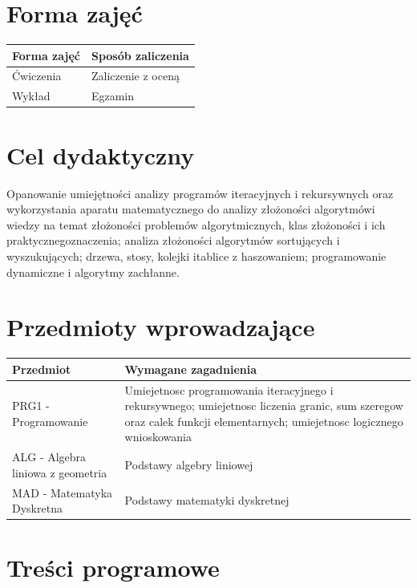 \documentclass[12pt, a4paper]{article}
\begin{document}
\section{Forma zajęć}

\begin{tabular}{ll}
  \hline
  \textbf{Forma zajęć} & \textbf{Sposób zaliczenia} \\
  \hline
  Ćwiczenia & Zaliczenie z oceną \\
  Wykład & Egzamin \\
  \hline
\end{tabular}

\section{Cel dydaktyczny}

Opanowanie umiejętności analizy programów iteracyjnych i rekursywnych oraz wykorzystania aparatu matematycznego do analizy złożoności algorytmówi wiedzy na temat złożoności problemów algorytmicznych, klas złożoności i ich praktycznegoznaczenia; analiza złożoności algorytmów sortujących i wyszukujących; drzewa, stosy, kolejki itablice z haszowaniem; programowanie dynamiczne i algorytmy zachłanne.

\section{Przedmioty wprowadzające}

\begin{tabularx}{\textwidth}{lX}
  \hline
  \textbf{Przedmiot} & \textbf{Wymagane zagadnienia} \\
  \hline
  PRG1 - Programowanie & Umiejetnosc programowania iteracyjnego i rekursywnego; umiejetnosc liczenia granic, sum szeregow oraz calek funkcji elementarnych; umiejetnosc logicznego wnioskowania \\
  ALG - Algebra liniowa z geometria & Podstawy algebry liniowej \\
  MAD - Matematyka Dyskretna & Podstawy matematyki dyskretnej \\
  \hline
\end{tabularx}

\section{Treści programowe}
\end{document}
